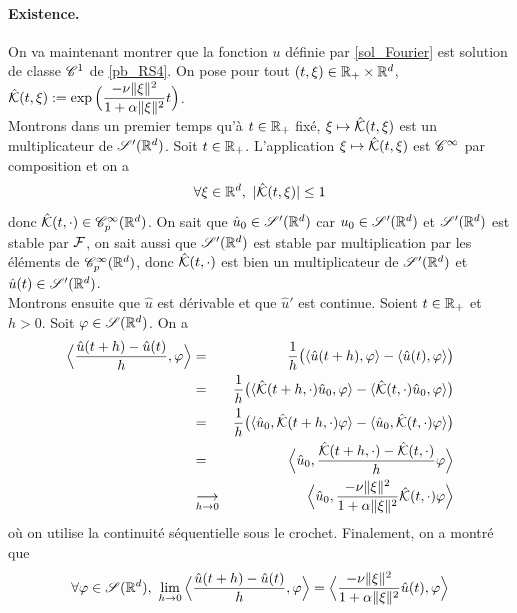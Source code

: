 \paragraph{Existence.} On va maintenant montrer que la fonction $u$ définie par \eqref{sol_Fourier} est solution de classe $\mathscr{C}^1$ de \eqref{pb_RS4}. On pose 
pour tout $(t,\xi) \in \mathbb{R}_+ \times \mathbb{R}^d$, $\hat{\mathcal{K}}(t,\xi) := \exp\Big(\dfrac{-\nu \|\xi\|^2}{1+\alpha\|\xi\|^2}t\Big)$.
\\
Montrons dans un premier temps qu'à $t \in \mathbb{R}_+$ fixé, $\xi \mapsto \hat{\mathcal{K}}(t,\xi)$ est un multiplicateur de $\mathscr{S}'(\mathbb{R}^d)$. Soit $t \in \mathbb{R}_+$. L'application $\xi \mapsto \hat{\mathcal{K}}(t,\xi)$ est $\mathscr{C}^{\infty}$ par composition et on a 
\begin{equation}\label{ineq_K}
    \forall \xi \in \mathbb{R}^d, \ |\hat{\mathcal{K}}(t,\xi)| \leq 1
\end{equation}
donc $\hat{\mathcal{K}}(t,\cdot) \in \mathscr{C}^{\infty}_p(\mathbb{R}^d)$. On sait que $\hat{u}_0 \in\mathscr{S}'(\mathbb{R}^d)$ car $u_0 \in \mathscr{S}'(\mathbb{R}^d)$ et $\mathscr{S}'(\mathbb{R}^d)$ est stable par $\mathcal{F}$, on sait aussi que $\mathscr{S}'(\mathbb{R}^d)$ est stable par multiplication par les éléments de $\mathscr{C}^{\infty}_p(\mathbb{R}^d)$, donc $\hat{\mathcal{K}}(t,\cdot)$ est bien un multiplicateur de $\mathscr{S}'(\mathbb{R}^d)$ et $\hat{u}(t) \in \mathscr{S}'(\mathbb{R}^d)$.
\\
Montrons ensuite que $\hat{u}$ est dérivable et que $\hat{u}'$ est continue. Soient $t \in \mathbb{R}_+$ et $h>0$. Soit $\varphi \in \mathscr{S}(\mathbb{R}^d)$. On a 
\begin{eqnarray*}
    \Big\langle\frac{\hat{u}(t+h)-\hat{u}(t)}{h},\varphi \Big\rangle &=& \frac{1}{h}\big(\langle \hat{u}(t+h),\varphi\rangle - \langle \hat{u}(t),\varphi\rangle\big) \\
    &=&\frac{1}{h}\big(\langle \hat{\mathcal{K}}(t+h,\cdot)\hat{u}_0,\varphi\rangle - \langle \hat{\mathcal{K}}(t,\cdot)\hat{u}_0,\varphi \rangle\big) \\
    &=&\frac{1}{h}\big(\langle\hat{u}_0,\hat{\mathcal{K}}(t+h,\cdot)\varphi\rangle - \langle\hat{u}_0,\hat{\mathcal{K}}(t,\cdot)\varphi \rangle\big) \\
    &=& \Big\langle\hat{u}_0,\frac{\hat{\mathcal{K}}(t+h,\cdot)-\hat{\mathcal{K}}(t,\cdot)}{h}\varphi \Big\rangle \\
    &\underset{h \to 0}{\longrightarrow}& \Big\langle \hat{u}_0, \frac{-\nu\|\xi\|^2}{1+\alpha\|\xi\|^2}\hat{\mathcal{K}}(t,\cdot)\varphi\Big\rangle
\end{eqnarray*}
où on utilise la continuité séquentielle sous le crochet. Finalement, on a montré que 
\begin{equation*}
    \forall \varphi \in \mathscr{S}(\mathbb{R}^d), \ \lim_{h \to 0} \Big\langle\frac{\hat{u}(t+h)-\hat{u}(t)}{h},\varphi \Big\rangle = \Big\langle \frac{-\nu\|\xi\|^2}{1+\alpha\|\xi\|^2}\hat{u}(t), \varphi\Big\rangle
\end{equation*}
